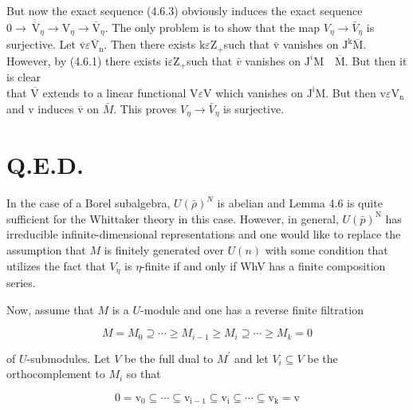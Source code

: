 \documentclass[10pt]{article}
\begin{document}
But now the exact sequence (4.6.3) obviously induces the exact sequence $0 \rightarrow \overline{\overline{\mathrm{~V}}}_{\eta} \rightarrow \mathrm{V}_{\eta} \rightarrow \overline{\mathrm{V}}_{\eta}$. The only problem is to show that the map $V_{\eta} \rightarrow \bar{V}_{\eta}$ is surjective. Let $\overline{\mathrm{v}} \varepsilon \overline{\mathrm{V}}_{\mathrm{n}}$. Then there exists $\mathrm{k} \varepsilon \mathrm{Z}_{+}$such that $\overline{\mathrm{v}}$ vanishes on $\mathrm{J}^{\mathrm{k}} \overline{\mathrm{M}}$. However, by (4.6.1) there exists $\mathrm{i} \varepsilon \mathrm{Z}_{+}$such that $\bar{v}$ vanishes on $\mathrm{J}^{i} \mathrm{M} \quad \overline{\mathrm{M}}$. But then it is clear\\
that $\overline{\mathrm{V}}$ extends to a linear functional $\mathrm{V} \varepsilon \mathrm{V}$ which vanishes on $\mathrm{J}^{\mathrm{i}} \mathrm{M}$. But then $\mathrm{v} \varepsilon \mathrm{V}_{\mathrm{n}}$ and v induces $\overline{\mathrm{v}}$ on $\bar{M}$. This proves $V_{\eta} \rightarrow \bar{V}_{\eta}$ is surjective.

\section{Q.E.D.}
In the case of a Borel subalgebra, $U(\bar{\rho})^{N}$ is abelian and Lemma 4.6 is quite sufficient for the Whittaker theory in this case. However, in general, $U(\bar{p})^{\mathrm{N}}$ has irreducible infinite-dimensional representations and one would like to replace the assumption that $M$ is finitely generated over $U(n)$ with some condition that utilizes the fact that $V_{\eta}$ is $\eta$-finite if and only if WhV has a finite composition series.

Now, assume that $M$ is a $U$-module and one has a reverse finite filtration


\begin{equation*}
M=M_{0} \supseteq \cdots \geq M_{i-1} \geq M_{i} \supseteq \cdots \geq M_{k}=0 \tag{4.6.7}
\end{equation*}


of $U$-submodules. Let $V$ be the full dual to $M^{\prime}$ and let $V_{i} \subseteq V$ be the orthocomplement to $M_{i}$ so that


\begin{equation*}
0=\mathrm{v}_{0} \subseteq \cdots \subseteq \mathrm{v}_{\mathrm{i}-1} \subseteq \mathrm{v}_{\mathrm{i}} \subseteq \cdots \subseteq \mathrm{v}_{\mathrm{k}}=\mathrm{v} \tag{4.6.8}
\end{equation*}
\end{document}
